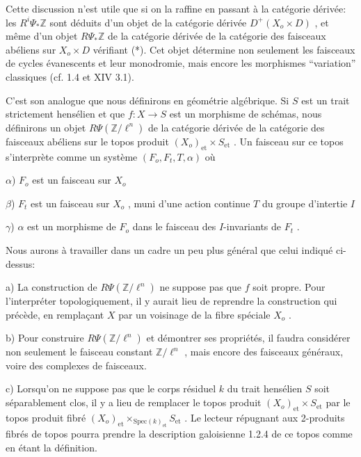 
Cette discussion n'est utile que si on la raffine en passant à la catégorie dérivée: les $R^i \Psi_* \mathbb{Z}$ sont déduits d'un objet de la catégorie dérivée $D^+(X_o \times D)$ , et même d'un objet $R\Psi_* \mathbb{Z}$ de la catégorie dérivée de la catégorie des faisceaux abéliens sur $X_o \times D$ vérifiant (*). Cet objet détermine non seulement les faisceaux de cycles évanescents et leur monodromie, mais encore les morphismes ``variation'' classiques (cf. 1.4 et XIV 3.1).

C'est son analogue que nous définirons en géométrie algébrique. Si $S$ est un trait strictement hensélien et que $f : X \to S$ est un morphisme de schémas, nous définirons un objet $R\Psi(\mathbb{Z}/\ell^n)$ de la catégorie dérivée de la catégorie des faisceaux abéliens sur le topos produit $(X_o)_{\mathrm{et}} \times S_{\mathrm{et}}$ . Un faisceau sur ce topos s'interprète comme un système $(F_o, F_t, T,\alpha)$ où

$\alpha$)  $F_o$ est un faisceau sur $X_o$

$\beta$)  $F_t$ est un faisceau sur $X_o$ , muni d'une action continue $T$ du groupe d'intertie $I$

$\gamma$)  $\alpha$ est un morphisme de $F_o$ dans le faisceau des $I$-invariants de $F_t$ .

Nous aurons à travailler dans un cadre un peu plus général que celui indiqué ci-dessus:

a)  La construction de $R \Psi( \mathbb{Z} /\ell^n)$ ne suppose pas que $f$ soit propre. Pour l'interpréter topologiquement, il y aurait lieu de reprendre la construction qui précède, en remplaçant $X$ par un voisinage de la fibre spéciale $X_o$ .

b)  Pour construire $R \Psi(\mathbb{Z}/\ell^n)$ et démontrer ses propriétés, il faudra considérer non seulement le faisceau constant $\mathbb{Z}/\ell^n$ , mais encore des faisceaux généraux, voire des complexes de faisceaux.

c)  Lorsqu'on ne suppose pas que le corps résiduel $k$ du trait hensélien $S$ soit séparablement clos, il y a lieu de remplacer le topos produit $(X_o)_{\mathrm{et}} \times S_{\mathrm{et}}$ par le topos produit fibré $(X_o)_{\mathrm{et}} \times_{\mathrm{Spec}(k)_{\mathrm{et}}} S_{\mathrm{et}}$ . Le lecteur répugnant aux 2-produits fibrés de topos pourra prendre la description galoisienne 1.2.4 de ce topos comme en étant la définition.


